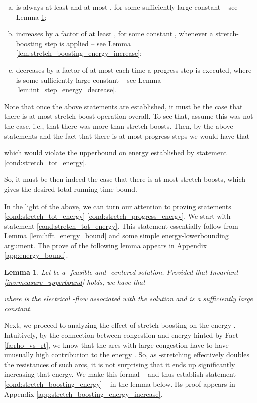 \documentclass[11pt, letterpaper]{article}
\newtheorem{lemma}[theorem]{Lemma}
\begin{document}
\begin{enumerate}[(a)]\addtolength{\itemsep}{-.4\baselineskip}
\item  is always at least  and at most , for some sufficiently large constant  -- see Lemma \ref{lem:energy_bound};\label{cond:stretch_tot_energy}
\item  increases by a factor of at least , for some constant , whenever a stretch-boosting step is applied -- see Lemma \ref{lem:stretch_boosting_energy_increase};\label{cond:stretch_boosting_energy}
\item  decreases by a factor of at most  each time a progress step is executed, where  is some sufficiently large constant -- see Lemma \ref{lem:int_step_energy_decrease}.\label{cond:stretch_progress_energy}
\end{enumerate}

Note that once the above statements are established, it must be the case that there is at most  stretch-boost operation overall. To see that, assume this was not the case, i.e., that there was more than  stretch-boosts. Then, by the above statements and the fact that there is at most  progress steps we would have that

which would violate the upperbound on energy  established by statement \eqref{cond:stretch_tot_energy}.

 So, it must be then indeed the case that there is at most  stretch-boosts, which gives the desired  total running time bound. 

In the light of the above, we can turn our attention to proving statements \eqref{cond:stretch_tot_energy}-\eqref{cond:stretch_progress_energy}. We start with statement \eqref{cond:stretch_tot_energy}. This statement essentially follow from Lemma \ref{lem:hfft_energy_bound} and some simple energy-lowerbounding argument. The prove of the following lemma appears in Appendix \ref{app:energy_bound}. 


\begin{lemma}
\label{lem:energy_bound}
Let  be a -feasible and -centered solution. Provided that Invariant \ref{inv:measure_upperbound} holds, we have that

where  is the electrical -flow associated with the solution  and  is a sufficiently large constant. 
\end{lemma}


Next, we proceed to analyzing the effect of stretch-boosting on the energy . Intuitively, by the connection between congestion and energy hinted  by Fact \ref{fa:rho_vs_rt}, we know that the arcs with large congestion have to have unusually high contribution to the energy . So, as -stretching effectively doubles the resistances of such arcs, it is not surprising that it ends up significantly increasing that energy. We make this formal -- and thus establish statement \eqref{cond:stretch_boosting_energy} -- in the lemma below. Its proof appears in Appendix \ref{app:stretch_boosting_energy_increase}.
\end{document}
